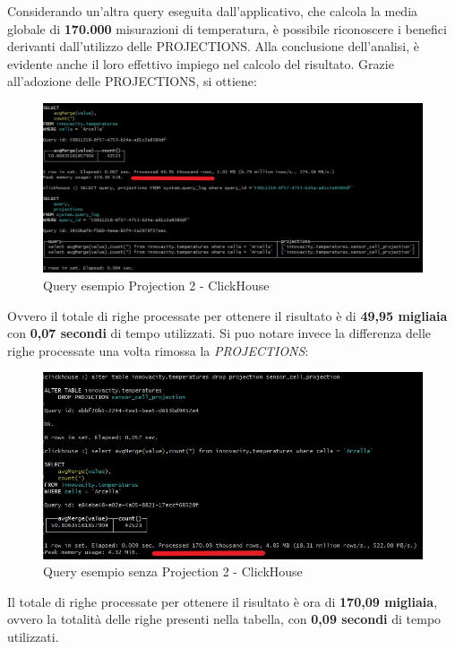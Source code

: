 Considerando un'altra query eseguita dall'applicativo, che calcola la media globale di \textbf{170.000} misurazioni di temperatura, è possibile riconoscere i benefici derivanti dall'utilizzo delle PROJECTIONS. Alla conclusione dell'analisi, è evidente anche il loro effettivo impiego nel calcolo del risultato. Grazie all'adozione delle PROJECTIONS, si ottiene:
\begin{figure}[H]
    \centering
    \includegraphics[width=1\textwidth]{../Images/SpecificaTecnica/query2ProjectionsWith.jpg}
    \caption{Query esempio Projection 2 - ClickHouse}
    \label{fig:with2proj}
  \end{figure}
Ovvero il totale di righe processate per ottenere il risultato è di \textbf{49,95 migliaia} con \textbf{0,07 secondi} di tempo utilizzati.
Si puo notare invece la differenza delle righe processate una volta rimossa la \textit{PROJECTIONS}:
\begin{figure}[H]
    \centering
    \includegraphics[width=1\textwidth]{../Images/SpecificaTecnica/query2ProjectionsWithout.jpg}
    \caption{Query esempio senza Projection 2 - ClickHouse}
    \label{fig:without2proj}
  \end{figure}

 Il totale di righe processate per ottenere il risultato è ora di \textbf{170,09 migliaia}, ovvero la totalità delle righe presenti nella tabella, con \textbf{0,09 secondi} di tempo utilizzati.

